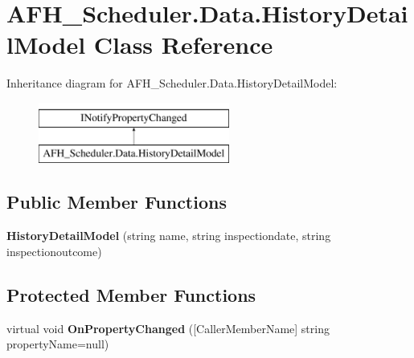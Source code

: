 \section{A\+F\+H\+\_\+\+Scheduler.\+Data.\+History\+Detail\+Model Class Reference}
\label{class_a_f_h___scheduler_1_1_data_1_1_history_detail_model}
Inheritance diagram for A\+F\+H\+\_\+\+Scheduler.\+Data.\+History\+Detail\+Model\+:\begin{figure}[H]
\begin{center}
\leavevmode
\includegraphics[height=2.000000cm]{class_a_f_h___scheduler_1_1_data_1_1_history_detail_model}
\end{center}
\end{figure}
\subsection*{Public Member Functions}
\begin{DoxyCompactItemize}
\item 
\mbox{\label{class_a_f_h___scheduler_1_1_data_1_1_history_detail_model_aa55882f1f37ea3989ad391d39629cc1c}} 
{\bfseries History\+Detail\+Model} (string name, string inspectiondate, string inspectionoutcome)
\end{DoxyCompactItemize}
\subsection*{Protected Member Functions}
\begin{DoxyCompactItemize}
\item 
\mbox{\label{class_a_f_h___scheduler_1_1_data_1_1_history_detail_model_a3c9e587e2b370f30dc19b35af33bab1d}} 
virtual void {\bfseries On\+Property\+Changed} ([Caller\+Member\+Name] string property\+Name=null)
\end{DoxyCompactItemize}
